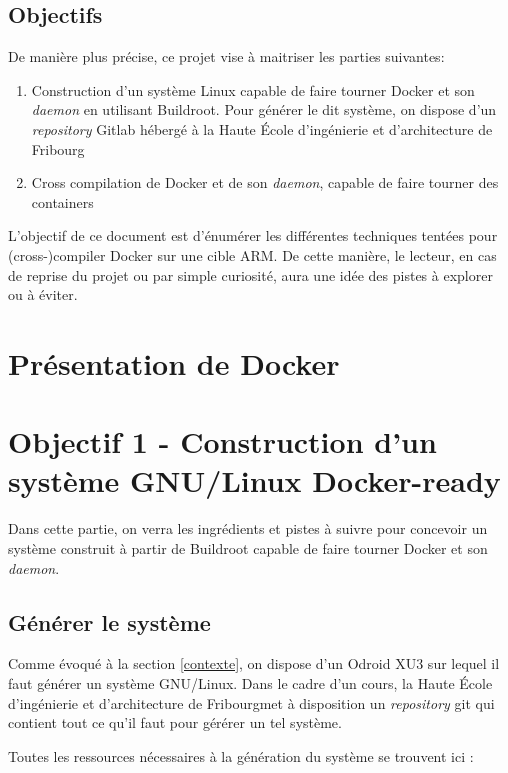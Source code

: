 \documentclass[11pt,a4paper,oneside]{report}
\newcommand{\school}{Haute École d'ingénierie et d'architecture de Fribourg}
\begin{document}
\section{Objectifs}

De manière plus précise, ce projet vise à maitriser les parties suivantes:

\begin{enumerate}
  \item Construction d'un système Linux capable de faire tourner Docker et son \emph{daemon} en utilisant Buildroot. Pour générer le dit système, on dispose d'un \emph{repository} Gitlab hébergé à la \school

  \item Cross compilation de Docker et de son \emph{daemon}, capable de faire tourner des containers
\end{enumerate}

L'objectif de ce document est d'énumérer les différentes techniques tentées pour (cross-)compiler Docker sur une cible ARM. De cette manière, le lecteur, en cas de reprise du projet ou par simple curiosité, aura une idée des pistes à explorer ou à éviter.

\chapter{Présentation de Docker}


\chapter{Objectif 1 - Construction d'un système GNU/Linux Docker-ready}

Dans cette partie, on verra les ingrédients et pistes à suivre pour concevoir un système construit à partir de Buildroot capable de faire tourner Docker et son \emph{daemon}.

\section{Générer le système}

Comme évoqué à la section \ref{contexte}, on dispose d'un Odroid XU3 sur lequel il faut générer un système GNU/Linux. Dans le cadre d'un cours, la \school met à disposition un \emph{repository} git qui contient tout ce qu'il faut pour gérérer un tel système.

Toutes les ressources nécessaires à la génération du système se trouvent ici :
\end{document}
